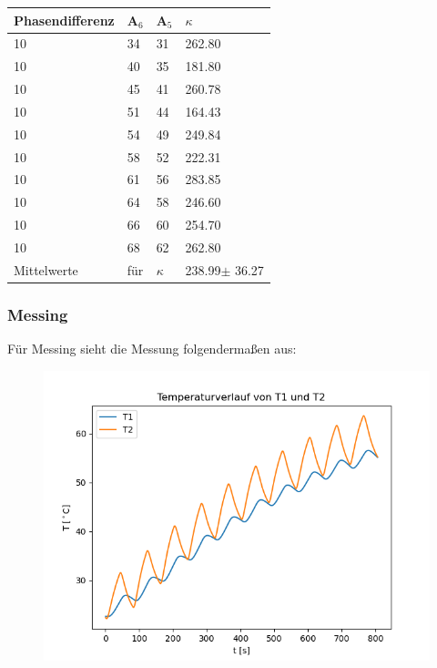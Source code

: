\begin{minipage}{\linewidth}
    \begin{table}[H]
        \centering
    \begin{tabular}{llll}
        \toprule
        Phasendifferenz & A$_6$ & A$_5$ & $\kappa$  \\
        \midrule
        10 & 34 & 31 & 262.80 \\
        10 & 40 & 35 & 181.80 \\
        10 & 45 & 41 & 260.78 \\
        10 & 51 & 44 & 164.43 \\
        10 & 54 & 49 & 249.84 \\
        10 & 58 & 52 & 222.31 \\
        10 & 61 & 56 & 283.85 \\
        10 & 64 & 58 & 246.60 \\
        10 & 66 & 60 & 254.70 \\
        10 & 68 & 62 & 262.80 \\
        \midrule
        Mittelwerte&für&$\kappa$&238.99$\pm$ 36.27\\
        \bottomrule   
    \end{tabular}
\end{table}
\end{minipage}


\subsubsection{Messing}

Für Messing sieht die Messung folgendermaßen aus:

\begin{figure}[H]
    \centering
    \includegraphics{brass.png}
\end{figure}

